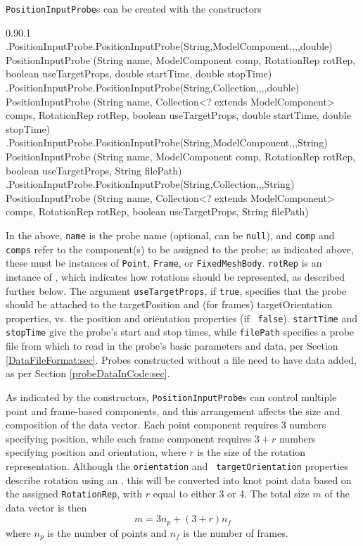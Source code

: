 {\tt PositionInputProbe}s can be created with the constructors
%
\begin{methodtable}{0.9}{0.1}
\midline
%
\methodentry
{\probes.PositionInputProbe.PositionInputProbe(String,ModelComponent,,,,double)}%
{PositionInputProbe (String name, ModelComponent comp, RotationRep rotRep,\brh
boolean useTargetProps, double startTime, double stopTime)}%
{\ }%
%
\methodspace{0.5em}%
\methodentry
{\probes.PositionInputProbe.PositionInputProbe(String,Collection,,,,double)}%
{PositionInputProbe (String name, Collection<? extends ModelComponent> comps,\brh
RotationRep rotRep, 
boolean useTargetProps, double startTime, double stopTime)}%
{\ }%
%
\methodspace{0.5em}%
\methodentry
{\probes.PositionInputProbe.PositionInputProbe(String,ModelComponent,,,String)}%
{PositionInputProbe (String name, ModelComponent comp, RotationRep rotRep,\brh
boolean useTargetProps, String filePath)}%
{\ }%
%
\methodspace{0.5em}%
\methodentry
{\probes.PositionInputProbe.PositionInputProbe(String,Collection,,,String)}%
{PositionInputProbe (String name, Collection<? extends ModelComponent> comps,\brh
RotationRep rotRep, boolean useTargetProps, String filePath)}%
{\ }%
\midline
\end{methodtable}
%
In the above, {\tt name} is the probe name (optional, can be {\tt null}), and
{\tt comp} and {\tt comps} refer to the component(s) to be assigned to the
probe; as indicated above, these must be instances of {\tt Point}, {\tt Frame},
or {\tt FixedMeshBody}. {\tt rotRep} is an instance of 
, which indicates 
how rotations should be represented, as described further below.  The argument
{\tt useTargetProps}, if {\tt true}, specifies that the probe should be
attached to the {\sf targetPosition} and (for frames) {\sf targetOrientation}
properties, vs. the {\sf position} and {\sf orientation} properties (if {\tt
false}). {\tt startTime} and {\tt stopTime} give the probe's start and stop
times, while {\tt filePath} specifies a probe file from which to read in the
probe's basic parameters and data, per Section \ref{DataFileFormat:sec}.  Probes
constructed without a file need to have data added, as per Section
\ref{probeDataInCode:sec}.

As indicated by the constructors, {\tt PositionInputProbe}s can control multiple
point and frame-based components, and this arrangement affects the size and
composition of the data vector. Each point component requires 3 numbers
specifying position, while each frame component requires $3 + r$ numbers
specifying position and orientation, where $r$ is the size of the
rotation representation. Although the {\tt orientation} and {\tt
targetOrientation} properties describe rotation using an
, this will be converted
into knot point data based on the assigned {\tt RotationRep}, with $r$ equal to
either 3 or 4. The total size $m$ of the data vector is then
%
\begin{equation*}
m = 3 n_p + (3 + r) n_f
\end{equation*}
%
where $n_p$ is the number of points and $n_f$ is the number of frames.

